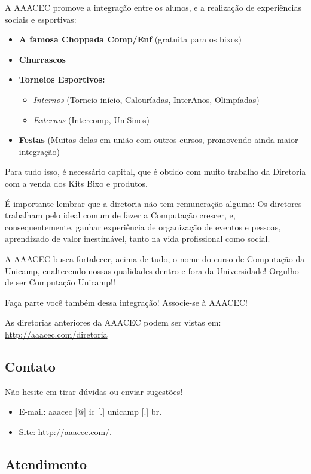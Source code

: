 A AAACEC promove a integração entre os alunos, e a realização de experiências
sociais e esportivas:

\begin{itemize}
\item  \textbf{A famosa Choppada Comp/Enf} (gratuita para os bixos)
\item  \textbf{Churrascos}
\item  \textbf{Torneios Esportivos:}
\begin{itemize}
\item  \textit{Internos} (Torneio início, Calouríadas, InterAnos, Olimpíadas)
\item  \textit{Externos} (Intercomp, UniSinos)
\end{itemize}
\item  \textbf{Festas} (Muitas delas em união com outros cursos, promovendo ainda maior integração)
\end{itemize}

Para tudo isso, é necessário capital, que é obtido com muito trabalho da
Diretoria com a venda dos Kits Bixo e produtos.

É importante lembrar que a diretoria não tem remuneração alguma: Os diretores
trabalham pelo ideal comum de fazer a Computação crescer, e, consequentemente,
ganhar experiência de organização de eventos e pessoas, aprendizado de valor
inestimável, tanto na vida profissional como social.

A AAACEC busca fortalecer, acima de tudo, o nome do curso de Computação da
Unicamp, enaltecendo nossas qualidades dentro e fora da Universidade! Orgulho de
ser Computação Unicamp!!

Faça parte você também dessa integração! Associe-se à AAACEC!

As diretorias anteriores da AAACEC podem ser vistas em:
\url{http://aaacec.com/diretoria}

\subsection{Contato}

Não hesite em tirar dúvidas ou enviar sugestões!

\begin{itemize}
\item  E-mail: aaacec [@] ic [.] unicamp [.] br.
\item  Site: \url{http://aaacec.com/}.
\end{itemize}

\subsection{Atendimento}


